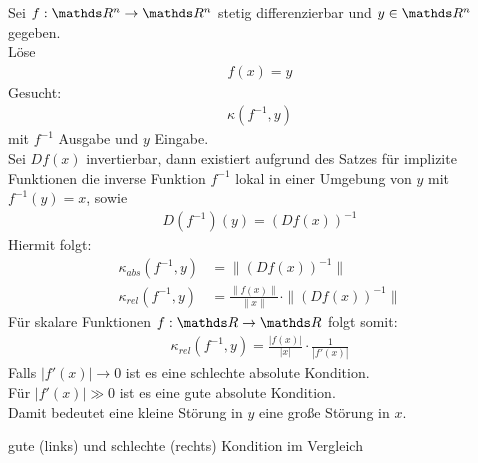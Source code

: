 \begin{Bspe}
  Sei $f:\Ren\rightarrow\Ren$ stetig differenzierbar und $y\in\Ren$ gegeben. \\
  Löse
  \begin{gather*}
    f(x) = y
  \end{gather*}
  Gesucht:
  \begin{gather*}
    \kappa(f^{-1},y)
  \end{gather*}
  mit $f^{-1}$ Ausgabe und $y$ Eingabe. \\
  Sei $Df(x)$ invertierbar, dann existiert aufgrund des Satzes für implizite Funktionen die inverse Funktion $f^{-1}$ lokal in einer Umgebung von $y$ mit $f^{-1}(y)=x$, sowie
  \begin{gather*}
    D(f^{-1})(y) = (Df(x))^{-1}
  \end{gather*}
  Hiermit folgt:
  \begin{align}
    \nonumber
    \kappa_{abs}(f^{-1},y) &= \|(Df(x))^{-1}\| \\
    \kappa_{rel}(f^{-1},y) &= \frac{\|f(x)\|}{\|x\|}\cdot\|(Df(x))^{-1}\|  \label{III.2.15}
  \end{align}
  Für skalare Funktionen $f:\R\rightarrow\R$ folgt somit:
  \begin{gather*}
    \kappa_{rel}(f^{-1},y) = \frac{|f(x)|}{|x|}\cdot \frac{1}{|f'(x)|}
  \end{gather*}
  Falls $|f'(x)|\longrightarrow 0$ ist es eine schlechte absolute Kondition. \\
  Für $|f'(x)| \gg 0$ ist es eine gute absolute Kondition.\\
  Damit bedeutet eine kleine Störung in $y$ eine große Störung in $x$.\\
  \begin{image}{gute (links) und schlechte (rechts) Kondition im Vergleich}
\end{image}
\end{Bspe}
